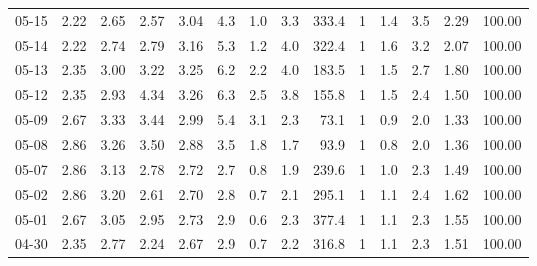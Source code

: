 \begin{threeparttable}
{\begin{tabular}{lrrrrrrrrrrrrr}
  05-15 &          2.22 &          2.65 &          2.57 &        3.04 &                 4.3 &                 1.0 &        3.3 &        333.4 &              1 &                 1.4 &              3.5 &            2.29 &                 100.00 \\
  05-14 &          2.22 &          2.74 &          2.79 &        3.16 &                 5.3 &                 1.2 &        4.0 &        322.4 &              1 &                 1.6 &              3.2 &            2.07 &                 100.00 \\
  05-13 &          2.35 &          3.00 &          3.22 &        3.25 &                 6.2 &                 2.2 &        4.0 &        183.5 &              1 &                 1.5 &              2.7 &            1.80 &                 100.00 \\
  05-12 &          2.35 &          2.93 &          4.34 &        3.26 &                 6.3 &                 2.5 &        3.8 &        155.8 &              1 &                 1.5 &              2.4 &            1.50 &                 100.00 \\
  05-09 &          2.67 &          3.33 &          3.44 &        2.99 &                 5.4 &                 3.1 &        2.3 &         73.1 &              1 &                 0.9 &              2.0 &            1.33 &                 100.00 \\
  05-08 &          2.86 &          3.26 &          3.50 &        2.88 &                 3.5 &                 1.8 &        1.7 &         93.9 &              1 &                 0.8 &              2.0 &            1.36 &                 100.00 \\
  05-07 &          2.86 &          3.13 &          2.78 &        2.72 &                 2.7 &                 0.8 &        1.9 &        239.6 &              1 &                 1.0 &              2.3 &            1.49 &                 100.00 \\
  05-02 &          2.86 &          3.20 &          2.61 &        2.70 &                 2.8 &                 0.7 &        2.1 &        295.1 &              1 &                 1.1 &              2.4 &            1.62 &                 100.00 \\
  05-01 &          2.67 &          3.05 &          2.95 &        2.73 &                 2.9 &                 0.6 &        2.3 &        377.4 &              1 &                 1.1 &              2.3 &            1.55 &                 100.00 \\
  04-30 &          2.35 &          2.77 &          2.24 &        2.67 &                 2.9 &                 0.7 &        2.2 &        316.8 &              1 &                 1.1 &              2.3 &            1.51 &                 100.00 \\

\end{tabular}}
\end{threeparttable}

